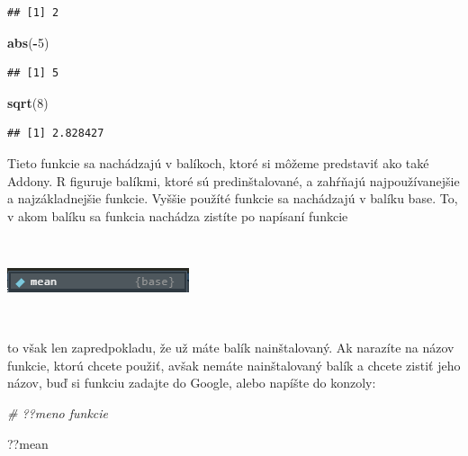 \documentclass[]{article}
\newenvironment{Shaded}{\begin{snugshade}}{\end{snugshade}}
\newcommand{\CommentTok}[1]{\textcolor[rgb]{0.56,0.35,0.01}{\textit{#1}}}
\newcommand{\DecValTok}[1]{\textcolor[rgb]{0.00,0.00,0.81}{#1}}
\newcommand{\KeywordTok}[1]{\textcolor[rgb]{0.13,0.29,0.53}{\textbf{#1}}}
\newcommand{\NormalTok}[1]{#1}
\newcommand{\OperatorTok}[1]{\textcolor[rgb]{0.81,0.36,0.00}{\textbf{#1}}}
\begin{document}
\begin{verbatim}
## [1] 2
\end{verbatim}

\begin{Shaded}
\begin{Highlighting}[]
\KeywordTok{abs}\NormalTok{(}\OperatorTok{-}\DecValTok{5}\NormalTok{)}
\end{Highlighting}
\end{Shaded}

\begin{verbatim}
## [1] 5
\end{verbatim}

\begin{Shaded}
\begin{Highlighting}[]
\KeywordTok{sqrt}\NormalTok{(}\DecValTok{8}\NormalTok{)}
\end{Highlighting}
\end{Shaded}

\begin{verbatim}
## [1] 2.828427
\end{verbatim}

Tieto funkcie sa nachádzajú v balíkoch, ktoré si môžeme predstaviť ako
také Addony. R figuruje balíkmi, ktoré sú predinštalované, a zahŕňajú
najpoužívanejšie a najzákladnejšie funkcie. Vyššie použíté funkcie sa
nachádzajú v balíku base. To, v akom balíku sa funkcia nachádza zistíte
po napísaní funkcie

~

\begin{center}

\includegraphics{diplomka obrazky/1.png}

\end{center}

~

to však len zapredpokladu, že už máte balík nainštalovaný. Ak narazíte
na názov funkcie, ktorú chcete použiť, avšak nemáte nainštalovaný balík
a chcete zistiť jeho názov, buď si funkciu zadajte do Google, alebo
napíšte do konzoly:

\begin{Shaded}
\begin{Highlighting}[]
\CommentTok{# ??meno funkcie}

\NormalTok{??mean}
\end{Highlighting}
\end{Shaded}
\end{document}
